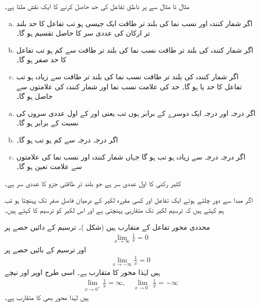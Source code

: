 مثال  تا مثال  سے  پر ناطق تفاعل کی حد حاصل کرنے کا ایک نقش ملتا ہے۔
\begin{enumerate}[a.]
\item
اگر شمار کنندہ اور نسب نما کی بلند تر طاقت ایک جیسی ہو تب تفاعل کا حد بلند تر ارکان کی عددی سر کا حاصل تقسیم ہو گا۔
\item
اگر شمار کنندہ کی بلند تر طاقت نسب نما کی بلند تر طاقت  سے کم ہو تب تفاعل کا حد صفر  ہو گا۔
\item
اگر شمار کنندہ کی بلند تر طاقت نسب نما کی بلند تر طاقت  سے زیادہ  ہو تب تفاعل کا حد  یا   ہو گا۔ حد کی علامت نسب نما اور شمار کنندہ کی علامتوں سے حاصل ہو گا۔ 
\end{enumerate}

\begin{enumerate}[a.]
\item 
اگر  درجہ  اور درجہ  ایک دوسرے کے برابر ہوں تب  یعنی 
  اور  کے اول عددی سروں کی نسبت کے برابر ہو گا۔ 
\item 
اگر  درجہ  درجہ   سے کم ہو تب  ہو گا۔
 \item 
اگر  درجہ  درجہ  سے زیادہ ہو تب ہو گا جہاں شمار کنندہ اور نسب نما کی علامتوں سے علامت تعین ہو گا۔
\end{enumerate}

کثیر رکنی  کا اول عددی سر  ہے جو بلند تر طاقتی جزو کا عددی سر ہے۔

اگر مبدا سے دور چلتے ہوئے ایک تفاعل اور کسی مقررہ لکیر کے درمیان فاصل صفر تک پہنچتا ہو تب ہم کہتے ہیں کہ ترسیم لکیر تک متقاربی پہنچتی ہے اور اس لکیر کو ترسیم کا  کہتے ہیں۔

محددی محور تفاعل  کے متقارب ہیں (شکل )۔ ترسیم کے دائیں حصے پر 
\begin{align*}
\lim_{x\to \infty}\frac{1}{x}=0
\end{align*}
اور ترسیم کے بائیں حصے پر
\begin{align*}
\lim_{x\to -\infty}\frac{1}{x}=0
\end{align*}
ہیں لہٰذا  محور  کا متقارب ہے۔ اسی  طرح  اوپر اور نیچے
\begin{align*}
\lim_{x\to 0^+}\frac{1}{x}=\infty,\quad \lim_{x\to 0^-}\frac{1}{x}=-\infty
\end{align*}
ہیں لہٰذا  محور بھی  کا متقارب ہے۔


